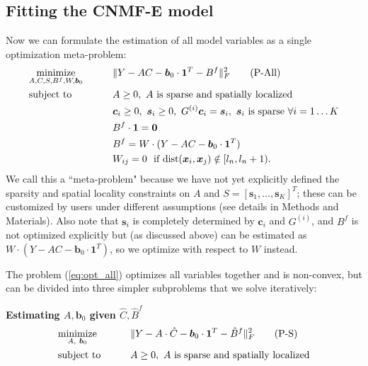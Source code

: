 \documentclass[9pt,lineno]{elife}
\begin{document}
\subsection{Fitting the CNMF-E model} \label{sec:model_fitting}
Now we can formulate the estimation of all model variables as a single optimization meta-problem: 
\begin{alignat}{2}
&\underset{A,C,S, B^f, W,\bm{b}_0}{\text{minimize}} &\qquad& \|Y-AC - \bm{b}_0\cdot \bm{1}^T- B^f\|_F^2 \label{eq:opt_all}\tag{P-All}\\
&\text{subject to} &\quad& A\geq 0, ~A \text{ is sparse and spatially localized} \notag\\
 &&&\bm{c}_i\geq 0,~ \bm{s}_i\geq 0, ~G^{(i)}\bm{c}_i = \bm{s}_i, ~ \bm{s}_i \text{ is sparse}~\forall i=1\ldots K\notag\\
&&& B^f\cdot \bm{1}= \bm{0} \notag\\
&&& B^f = W\cdot (Y-AC-\bm{b}_0\cdot \bm{1}^T) \notag\\
&&&W_{ij}=0 ~ \text{ if dist}(\bm{x}_i, \bm{x}_j)\notin [l_n, l_n+1). \notag
\end{alignat}
We call this a ``meta-problem" because we have not yet explicitly defined the sparsity and spatial locality constraints on $A$ and $S=[\bm{s}_1, \ldots, \bm{s}_K]^T$; these can be customized by users under different assumptions (see details in Methods and Materials). Also note that $\bm{s}_i$ is completely determined by $\bm{c}_i$ and $G^{(i)}$, and $B^f$ is not optimized explicitly but (as discussed above) can be estimated as $W\cdot (Y-AC-\bm{b}_0\cdot \bm{1}^T)$, so we optimize with respect to $W$ instead.  %

The problem (\ref{eq:opt_all}) optimizes all variables together and is  non-convex, but can be divided into three simpler subproblems that we solve iteratively: 

\textbf{Estimating $A, \bm{b}_0$ given $\hat{C}, \hat{B}^f$}
\begin{alignat}{2}
&\underset{A, ~ \bm{b}_0}{\text{minimize}} &\qquad& \|Y-{A}\cdot \hat{C} - \bm{b}_0\cdot \bm{1}^T- \hat{B}^f\|_F^2 \label{eq:opt_A}\tag{P-S}\\
&\text{subject to}&& A\geq 0, ~A \text{ is sparse and spatially localized} \notag
\end{alignat}
\end{document}
